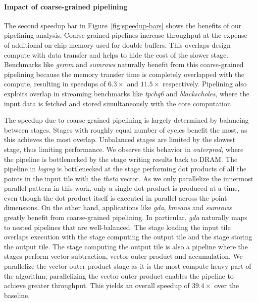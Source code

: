 \paragraph{Impact of coarse-grained pipelining}
The second speedup bar in Figure~\ref{fig:speedup-bars} shows the benefits of our pipelining analysis.
Coarse-grained pipelines increase throughput
at the expense of additional on-chip memory used for double buffers.
This overlaps design compute with data transfer and helps to hide the cost of the slower stage. Benchmarks like
\emph{gemm} and \emph{sumrows} naturally benefit from this coarse-grained pipelining because the memory transfer time is completely overlapped
with the compute, resulting in speedups of $6.3\times$ and $11.5\times$ respectively.
Pipelining also exploits overlap in
streaming benchmarks like \emph{tpchq6} and \emph{blackscholes}, where the input data is fetched and stored simultaneously with the core computation.

The speedup due to coarse-grained pipelining is largely determined by balancing between stages. Stages with roughly equal number of cycles benefit
the most, as this achieves the most overlap. Unbalanced stages are limited by the slowest stage, thus limiting performance.
We observe this behavior in \emph{outerprod},
where the pipeline is bottlenecked by the stage writing results back to DRAM.
The pipeline in \emph{logreg} is bottlenecked
at the stage performing dot products of all the points in the input tile with the \emph{theta} vector. As we only parallelize the
innermost parallel pattern in this work, only a single dot product is produced at a time, even though the dot product itself
is executed in parallel across the point dimensions. On the other hand, applications
like \emph{gda}, \emph{kmeans} and \emph{sumrows} greatly benefit from coarse-grained pipelining.
In particular, \emph{gda} naturally
maps to nested pipelines that are well-balanced.
The stage loading the input tile overlaps execution with the stage
computing the output tile and the stage storing the output tile. The stage computing the output tile is also
a pipeline where the stages perform vector subtraction, vector outer product and accumulation. We parallelize the vector
outer product stage as it is the most compute-heavy part of the algorithm; parallelizing the vector outer product enables
the pipeline to achieve greater throughput. This yields an overall speedup of $39.4\times$
over the baseline.
